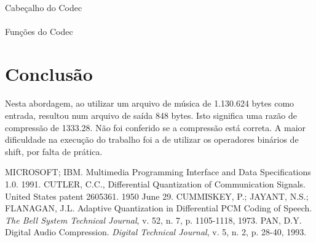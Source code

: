 \documentclass[a4paper,12pt]{article}
\begin{document}
\paragraph{}
Cabeçalho do Codec


\paragraph{}
Funções do Codec


\section{Conclusão}

\paragraph{}
Nesta abordagem, ao utilizar um arquivo de música de 1.130.624 bytes como entrada, resultou num arquivo de saída 848 bytes. Isto significa uma razão de compressão de 1333.28. Não foi conferido se a compressão está correta.
A maior dificuldade na execução do trabalho foi a de utilizar os operadores binários de shift, por falta de prática.

\begin{thebibliography}{}
	 MICROSOFT; IBM. Multimedia Programming Interface and Data Specifications 1.0. 1991.
	 CUTLER, C.C., Differential Quantization of Communication Signals. United States patent 2605361. 1950 June 29.
	 CUMMISKEY, P.; JAYANT, N.S.; FLANAGAN, J.L. Adaptive Quantization in Differential PCM Coding of Speech. \textit{The Bell System Technical Journal}, v. 52, n. 7, p. 1105-1118, 1973.
	 PAN, D.Y. Digital Audio Compression. \textit{Digital Technical Journal}, v. 5, n. 2, p. 28-40, 1993.
\end{thebibliography}
\end{document}
